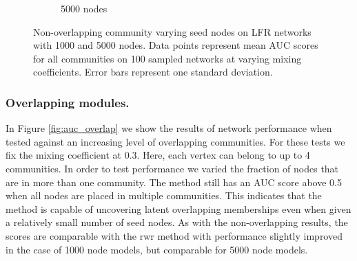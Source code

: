 \documentclass[sigconf]{acmart}
\begin{document}
\begin{figure}[t]
\begin{subfigure}[b]{0.45\textwidth}
        \caption{5000 nodes}
    \end{subfigure}
    \caption{Non-overlapping community varying seed nodes on LFR networks with 1000 and 5000 nodes.
     Data points represent mean AUC scores for all communities on 100 sampled networks at varying mixing coefficients.
     Error bars represent one standard deviation.}
     \label{fig:auc_no_overlap}
\end{figure}

\subsubsection{Overlapping modules.} 
In Figure \ref{fig:auc_overlap} we show the results of network performance when tested against an increasing level of overlapping communities.
For these tests we fix the mixing coefficient at $0.3$.
Here, each vertex can belong to up to 4 communities.
In order to test performance we varied the fraction of nodes that are in more than one community.
The method still has an AUC score above 0.5 when all nodes are placed in multiple communities.
This indicates that the method is capable of uncovering latent overlapping memberships even when given a relatively small number of seed nodes.
As with the non-overlapping results, the scores are comparable with the rwr method with performance slightly improved in the case of 1000 node models, but comparable for 5000 node models.
\end{document}
